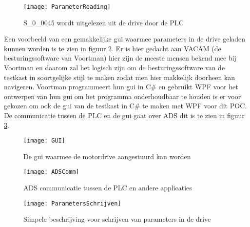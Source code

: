 \begin{figure}[H]
	\centering
	\texttt{[image: ParameterReading]}
	\label{fig:ParameterRead}
	\caption{S\_0\_0045 wordt uitgelezen uit de drive door de \gls{PLC}}
\end{figure}

Een voorbeeld van een gemakkelijke \gls{gui} waarmee parameters in de drive geladen kunnen worden is te zien in figuur \ref{fig:GUIControl}. Er is hier gedacht aan VACAM (de besturingssoftware van Voortman) hier zijn de meeste mensen bekend mee bij Voortman en daarom zal het logisch zijn om de besturingssoftware van de testkast in soortgelijke stijl te maken zodat men hier makkelijk doorheen kan navigeren. Voortman programmeert hun \gls{gui} in C\# en gebruikt \gls{WPF} voor het ontwerpen van hun \gls{gui} om het programma onderhoudbaar te houden is er voor gekozen om ook de \gls{gui} van de testkast in C\# te maken met \gls{WPF} voor dit \gls{POC}. De communicatie tussen de \gls{PLC} en de \gls{gui} gaat over \gls{ADS} dit is te zien in figuur \ref{fig:ADSCom}.

\begin{figure}[H]
	\centering
	\texttt{[image: GUI]}
	\label{fig:GUIControl}
	\caption{De \gls{gui} waarmee de motordrive aangestuurd kan worden}
\end{figure}

\begin{figure}[H]
	\centering
	\texttt{[image: ADSComm]}
	\label{fig:ADSCom}
	\caption{\gls{ADS} communicatie tussen de \gls{PLC} en andere applicaties}
\end{figure}

\begin{figure}[H]
	\centering
	\texttt{[image: ParametersSchrijven]}
	\label{fig:ParametersSchrijven}
	\caption{Simpele beschrijving voor schrijven van parameters in de drive}
\end{figure}

